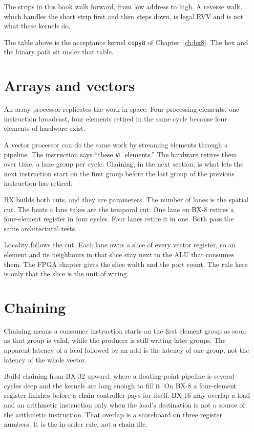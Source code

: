 The strips in this book walk forward, from low address to high. A reverse walk, which handles the short strip first and then steps down, is legal RVV and is not what these kernels do.

The table above is the acceptance kernel \texttt{copy8} of Chapter~\ref{ch:bx8}. The hex and the binary path sit under that table.

\section{Arrays and vectors}

An array processor replicates the work in space. Four processing elements, one instruction broadcast, four elements retired in the same cycle because four elements of hardware exist.

A vector processor can do the same work by streaming elements through a pipeline. The instruction says ``these \texttt{VL} elements.'' The hardware retires them over time, a lane group per cycle. Chaining, in the next section, is what lets the next instruction start on the first group before the last group of the previous instruction has retired.

BX builds both cuts, and they are parameters. The number of lanes is the spatial cut. The beats a lane takes are the temporal cut. One lane on BX-8 retires a four-element register in four cycles. Four lanes retire it in one. Both pass the same architectural tests.

Locality follows the cut. Each lane owns a slice of every vector register, so an element and its neighbours in that slice stay next to the ALU that consumes them. The FPGA chapter gives the slice width and the port count. The rule here is only that the slice is the unit of wiring.

\section{Chaining}

Chaining means a consumer instruction starts on the first element group as soon as that group is valid, while the producer is still writing later groups. The apparent latency of a load followed by an add is the latency of one group, not the latency of the whole vector.

Build chaining from BX-32 upward, where a floating-point pipeline is several cycles deep and the kernels are long enough to fill it. On BX-8 a four-element register finishes before a chain controller pays for itself. BX-16 may overlap a load and an arithmetic instruction only when the load's destination is not a source of the arithmetic instruction. That overlap is a scoreboard on three register numbers. It is the in-order rule, not a chain file.

